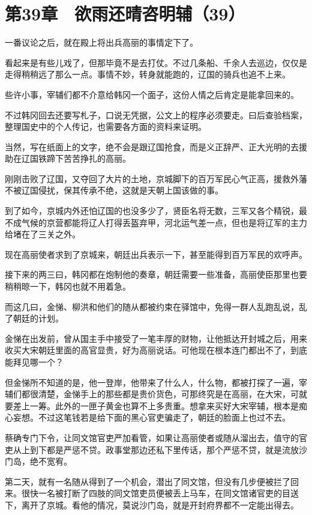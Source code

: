 \section{第39章　欲雨还晴咨明辅（39）}

一番议论之后，就在殿上将出兵高丽的事情定下了。

看起来是有些儿戏了，但那毕竟不是去打仗。不过几条船、千余人去巡边，仅仅是走得稍稍远了那么一点。事情不妙，转身就能跑的，辽国的骑兵也追不上来。

些许小事，宰辅们都不介意给韩冈一个面子，这份人情之后肯定是能拿回来的。

不过韩冈回去还要写札子，口说无凭据，公文上的程序必须要走。曰后查验档案，整理国史中的个人传记，也需要各方面的资料来证明。

当然，写在纸面上的文字，绝不会是跟辽国抢食，而是义正辞严、正大光明的去援助在辽国铁蹄下苦苦挣扎的高丽。

刚刚击败了辽国，又夺回了大片的土地，京城脚下的百万军民心气正高，援救外藩不被辽国侵扰，保其传承不绝，这就是天朝上国该做的事。

到了如今，京城内外还怕辽国的也没多少了，贤臣名将无数，三军又各个精锐，最不成气候的京营都能将辽人打得丢盔弃甲，河北运气差一点，但也是将辽军的主力给堵在了三关之外。

现在高丽使者求到了京城来，朝廷出兵表示一下，甚至能得到百万军民的欢呼声。

接下来的两三曰，韩冈都在炮制他的奏章，朝廷需要一些准备，高丽使臣那里也要稍稍晾一下，韩冈也就不用着急。

而这几曰，金悌、柳洪和他们的随从都被约束在驿馆中，免得一群人乱跑乱说，乱了朝廷的计划。

金悌在出发前，曾从国主手中接受了一笔丰厚的财物，让他抵达开封城之后，用来收买大宋朝廷里面的高官显贵，好为高丽说话。可他现在根本连门都出不了，到底能拜见哪一个？

但金悌所不知道的是，他一登岸，他带来了什么人，什么物，都被打探了一遍，宰辅们都很清楚，金悌手上的那些都是贵价货色，可那终究是在高丽，在大宋，可就要差上一筹。此外的一匣子黄金也算不上多贵重。想拿来买好大宋宰辅，根本是痴心妄想。不过这笔钱若是给下面的黑心官吏骗走了，朝廷的脸面上也过不去。

蔡确专门下令，让同文馆官吏严加看管，如果让高丽使者或随从溜出去，值守的官吏从上到下都是严惩不贷。政事堂那边还私下里传话，那个严惩不贷，就是流放沙门岛，绝不宽宥。

第二天，就有一名随从得到了一个机会，潜出了同文馆，但没有几步便被拦了回来。很快一名被打断了四肢的同文馆吏员便被丢上马车，在同文馆诸官吏的目送下，离开了京城。看他的情况，莫说沙门岛，就是开封府界都不一定能出得去。

